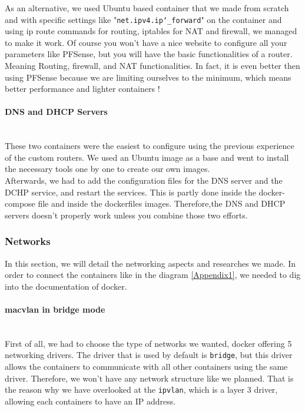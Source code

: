 \documentclass[a4paper,11pt,singlespacing]{article}
\begin{document}
As an alternative, we used Ubuntu based container that we made from scratch and with specific settings like "\texttt{net.ipv4.ip\char`_forward}" on the container and using ip route commands for routing, iptables for NAT and firewall, we managed to make it work. Of course you won't have a nice website to configure all your parameters like PFSense, but you will have the basic functionalities of a router. Meaning Routing, firewall, and NAT functionalities. In fact, it is even better then using PFSense because we are limiting ourselves to the minimum, which means better performance and lighter containers !

\paragraph{DNS and DHCP Servers}
\leavevmode\\
These two containers were the easiest to configure using the previous experience of the custom routers. We used an Ubuntu image as a base and went to install the necessary tools one by one to create our own images.\\

Afterwards, we had to add the configuration files for the DNS server and the DCHP service, and restart the services. This is partly done inside the docker-compose file and inside the dockerfiles images. Therefore,the DNS and DHCP servers doesn't properly work unless you combine those two efforts. 

\subsubsection{Networks}
In this section, we will detail the networking aspects and researches we made. In order to connect the containers like in the diagram \ref{Appendix1}, we needed to dig into the documentation of docker.

\paragraph{macvlan in bridge mode}
\leavevmode\\
First of all, we had to choose the type of networks we wanted, docker offering 5 networking drivers. The driver that is used by default is \texttt{bridge}, but this driver allows the containers to communicate with all other containers using the same driver. Therefore, we won't have any network structure like we planned. That is the reason why we have overlooked at the \texttt{ipvlan}, which is a layer 3 driver, allowing each containers to have an IP address.\\
\end{document}
